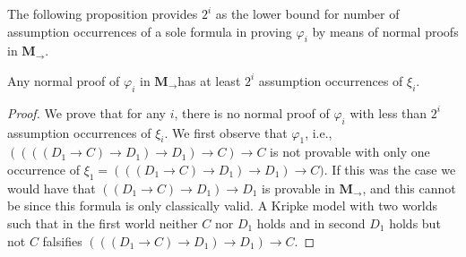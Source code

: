 \documentclass[11pt]{llncs}
\newcommand{\imply}{\ensuremath{\rightarrow}}
\newcommand{\mil}{\ensuremath{\mathbf{M}_{\rightarrow}}}
\begin{document}
The following proposition provides $2^{i}$ as the lower bound for number of assumption occurrences of a sole formula in proving $\varphi_i$ by means of normal proofs in \mil.

\begin{theorem}\label{lower}
Any normal proof of $\varphi_i$ in \mil has at least $2^i$ assumption occurrences of $\xi_i$.
\end{theorem}

\begin{proof}
We prove that for any $i$, there is no normal proof of $\varphi_i$ with less than $2^{i}$ assumption occurrences of $\xi_i$.
We first observe that $\varphi_1$, i.e., $((((D_1\imply C)\imply D_1)\imply D_1)\imply C)\imply C$  is not provable with 
only one occurrence of $\xi_1=(((D_1\imply C)\imply D_1)\imply D_1)\imply C)$. If this was the case we would have
that $((D_1\imply C)\imply D_1)\imply D_1$ is provable in \mil, and this cannot be since this formula is only classically valid.
A Kripke model with two worlds such that in the first world neither $C$ nor $D_1$ holds and in second $D_1$ holds but not $C$ falsifies $(((D_1\imply C)\imply D_1)\imply D_1)\imply C$.


\end{proof}
\end{document}
